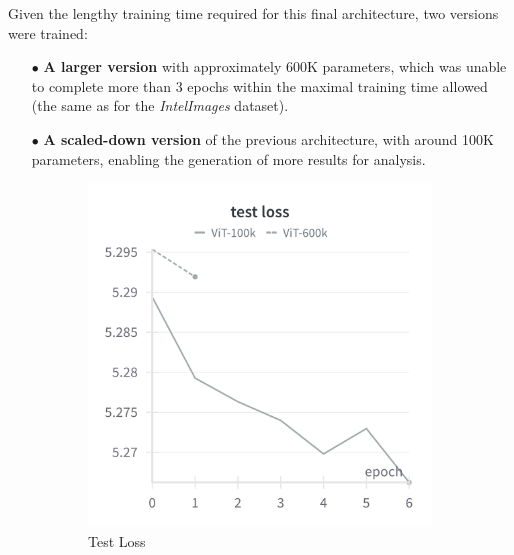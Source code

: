 \documentclass[twocolumn,superscriptaddress,aps]{revtex4-1}
\begin{document}
Given the lengthy training time required for this final architecture, two versions were trained:

\begin{itemize}
    \setlength{\itemsep}{1mm}
    \item [$\bullet$] \textbf{A larger version} with approximately 600K parameters, which was unable to complete more than 3 epochs within the maximal training time allowed (the same as for the \textit{IntelImages} dataset). 
    \item [$\bullet$] \textbf{A scaled-down version} of the previous architecture, with around 100K parameters, enabling the generation of more results for analysis.
\end{itemize}



\begin{figure}[H]
    \centering
    \begin{subfigure}{0.235 \textwidth}
        \includegraphics[width = 0.99 \textwidth]{images/205classes_vit_test.png}
        \caption{Test Loss}
    \end{subfigure}
    \begin{subfigure}{0.235 \textwidth}

\end{subfigure}
\end{figure}
\end{document}
